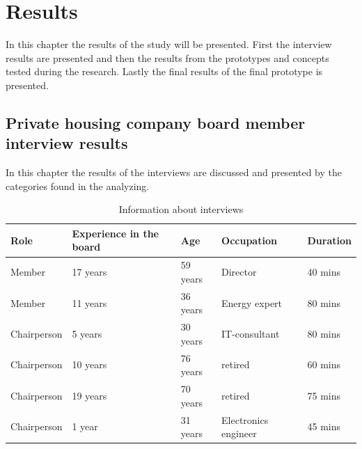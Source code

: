 \chapter{Results}
\label{chapter:results}

In this chapter the results of the study will be presented. First the interview results are presented and then the results from the prototypes and concepts tested during the research. Lastly the final results of the final prototype is presented. 

\section{Private housing company board member interview results}
\label{section:interviews}
In this chapter the results of the interviews are discussed and presented by the categories found in the analyzing.

\begin{table}
\begin{tabular}{|p{2.3cm}|p{2.8cm}|p{1.8cm}|p{2.7cm}|p{1.9cm}|} 
\hline %
\textbf{Role} & \raggedright\textbf{Experience in the board} & \textbf{Age} & \textbf{Occupation} & \textbf{Duration} \\ 
\hline 
Member & 17 years & 59 years & Director & 40 mins \\ 
\hline
Member & 11 years & 36 years & Energy expert & 80 mins \\  
\hline
Chairperson & 5 years & 30 years & IT-consultant & 80 mins \\
\hline
Chairperson & 10 years & 76 years & retired & 60 mins \\
\hline
Chairperson & 19 years & 70 years & retired & 75 mins \\
\hline
Chairperson & 1 year & 31 years & Electronics engineer & 45 mins \\
\hline
\end{tabular} %
\caption{Information about interviews}
\label{table:interviewtb}
\end{table} %

